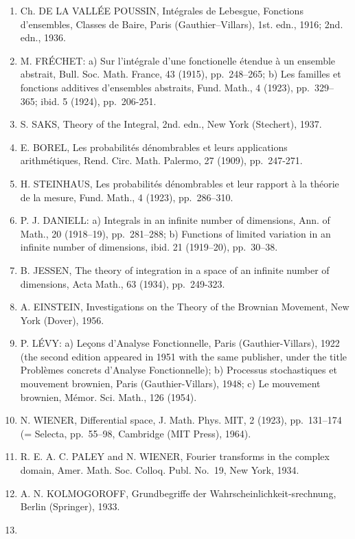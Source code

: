
\begin{enumerate}
\def\labelenumi{(\Roman{enumi})}
\item
  Ch. DE LA VALLÉE POUSSIN, Intégrales de Lebesgue, Fonctions d'ensembles, Classes de Baire, Paris (Gauthier--Villars), 1st. edn., 1916; 2nd. edn., 1936.
\item
  M. FRÉCHET: a) Sur l'intégrale d'une fonctionelle étendue à un ensemble abstrait, Bull. Soc. Math. France, 43 (1915), pp.~248--265; b) Les familles et fonctions additives d'ensembles abstraits, Fund. Math., 4 (1923), pp.~329--365; ibid. 5 (1924), pp.~206-251.
\item
  S. SAKS, Theory of the Integral, 2nd. edn., New York (Stechert), 1937.
\item
  E. BOREL, Les probabilités dénombrables et leurs applications arithmétiques, Rend. Circ. Math. Palermo, 27 (1909), pp.~247-271.
\item
  H. STEINHAUS, Les probabilités dénombrables et leur rapport à la théorie de la mesure, Fund. Math., 4 (1923), pp.~286--310.
\item
  P. J. DANIELL: a) Integrals in an infinite number of dimensions, Ann. of Math., 20 (1918--19), pp.~281--288; b) Functions of limited variation in an infinite number of dimensions, ibid. 21 (1919--20), pp.~30--38.
\item
  B. JESSEN, The theory of integration in a space of an infinite number of dimensions, Acta Math., 63 (1934), pp.~249-323.
\item
  A. EINSTEIN, Investigations on the Theory of the Brownian Movement, New York (Dover), 1956.
\item
  P. LÉVY: a) Leçons d'Analyse Fonctionnelle, Paris (Gauthier-Villars), 1922 (the second edition appeared in 1951 with the same publisher, under the title Problèmes concrets d'Analyse Fonctionnelle); b) Processus stochastiques et mouvement brownien, Paris (Gauthier-Villars), 1948; c) Le mouvement brownien, Mémor. Sci. Math., 126 (1954).
\item
  N. WIENER, Differential space, J. Math. Phys. MIT, 2 (1923), pp.~131--174 (= Selecta, pp.~55--98, Cambridge (MIT Press), 1964).
\item
  R. E. A. C. PALEY and N. WIENER, Fourier transforms in the complex domain, Amer. Math. Soc. Colloq. Publ. No.~19, New York, 1934.
\item
  A. N. KOLMOGOROFF, Grundbegriffe der Wahrscheinlichkeit-srechnung, Berlin (Springer), 1933.
\item

\end{enumerate}
